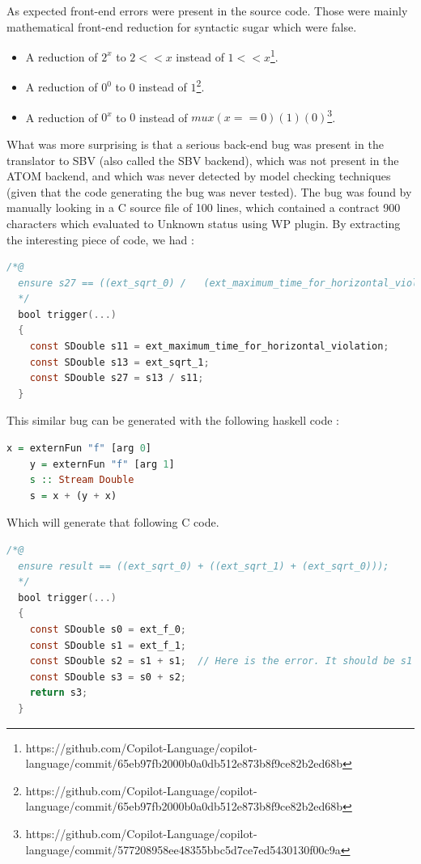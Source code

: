 \documentclass[a4paper,11pt,final]{article}
\begin{document}
  As expected front-end errors were present in the source code. Those were mainly mathematical front-end reduction for syntactic sugar which were false.
  
 \begin{itemize}
 	\item A reduction of $2^x$ to $2 << x$ instead of $1 << x$\footnote{https://github.com/Copilot-Language/copilot-language/commit/65eb97fb2000b0a0db512e873b8f9ce82b2ed68b}.
 	\item A reduction of $0^0$ to $0$ instead of $1$\footnote{https://github.com/Copilot-Language/copilot-language/commit/65eb97fb2000b0a0db512e873b8f9ce82b2ed68b}.
 	\item A reduction of $0^x$ to $0$ instead of $mux (x==0) (1) (0)$\footnote{https://github.com/Copilot-Language/copilot-language/commit/577208958ee48355bbc5d7ce7ed5430130f00c9a}.
 \end{itemize}
  
  What was more surprising is that a serious back-end bug was present in the translator to SBV (also called the SBV backend), which was not present in the ATOM backend, and which was never detected by model checking techniques (given that the code generating the bug was never tested). The bug was found by manually looking in a C source file of 100 lines, which contained a contract 900 characters which evaluated to Unknown status using WP plugin. By extracting the interesting piece of code, we had :
  \begin{lstlisting}[language=C, keywordstyle=\color{blue}]
  /*@
  ensure s27 == ((ext_sqrt_0) /   (ext_maximum_time_for_horizontal_violation));
  */
  bool trigger(...)
  {
    const SDouble s11 = ext_maximum_time_for_horizontal_violation;
    const SDouble s13 = ext_sqrt_1;
    const SDouble s27 = s13 / s11;
  }  \end{lstlisting}
  This similar bug can be generated with the following haskell code :
  \begin{lstlisting}[language=Haskell]
    x = externFun "f" [arg 0]
    y = externFun "f" [arg 1]
  	s :: Stream Double
  	s = x + (y + x)
  \end{lstlisting}
  Which will generate that following C code.
  \begin{lstlisting}[language=C, keywordstyle=\color{blue}]
  /*@
  ensure result == ((ext_sqrt_0) + ((ext_sqrt_1) + (ext_sqrt_0)));
  */
  bool trigger(...)
  {
    const SDouble s0 = ext_f_0;
    const SDouble s1 = ext_f_1;
    const SDouble s2 = s1 + s1;  // Here is the error. It should be s1 + s0;
    const SDouble s3 = s0 + s2;
    return s3;
  }  \end{lstlisting}
  
\end{document}
